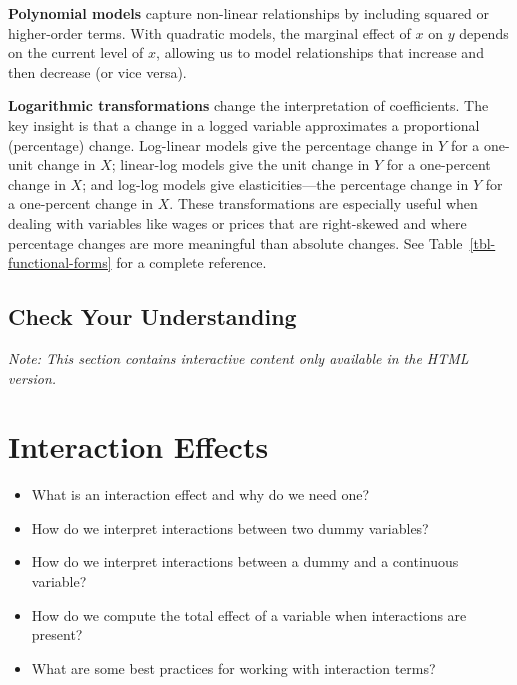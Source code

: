 \documentclass[
  letterpaper,
  DIV=11,
  numbers=noendperiod]{scrreprt}
\providecommand{\tightlist}{%
  \setlength{\itemsep}{0pt}\setlength{\parskip}{0pt}}
\begin{document}
\textbf{Polynomial models} capture non-linear relationships by including
squared or higher-order terms. With quadratic models, the marginal
effect of \(x\) on \(y\) depends on the current level of \(x\), allowing
us to model relationships that increase and then decrease (or vice
versa).

\textbf{Logarithmic transformations} change the interpretation of
coefficients. The key insight is that a change in a logged variable
approximates a proportional (percentage) change. Log-linear models give
the percentage change in \(Y\) for a one-unit change in \(X\);
linear-log models give the unit change in \(Y\) for a one-percent change
in \(X\); and log-log models give elasticities---the percentage change
in \(Y\) for a one-percent change in \(X\). These transformations are
especially useful when dealing with variables like wages or prices that
are right-skewed and where percentage changes are more meaningful than
absolute changes. See Table~\ref{tbl-functional-forms} for a complete
reference.

\section{Check Your Understanding}\label{check-your-understanding-5}

\emph{Note: This section contains interactive content only available in
the HTML version.}


\chapter{Interaction Effects}\label{sec-interaction-effects}

\begin{tcolorbox}[enhanced jigsaw, arc=.35mm, bottomrule=.15mm, bottomtitle=1mm, breakable, colback=white, colbacktitle=quarto-callout-tip-color!10!white, colframe=quarto-callout-tip-color-frame, coltitle=black, left=2mm, leftrule=.75mm, opacityback=0, opacitybacktitle=0.6, rightrule=.15mm, title=\textcolor{quarto-callout-tip-color}{\faLightbulb}\hspace{0.5em}{\textbf{Key Questions}}, titlerule=0mm, toprule=.15mm, toptitle=1mm]

\begin{itemize}
\tightlist
\item
  What is an interaction effect and why do we need one?
\item
  How do we interpret interactions between two dummy variables?
\item
  How do we interpret interactions between a dummy and a continuous
  variable?
\item
  How do we compute the total effect of a variable when interactions are
  present?
\item
  What are some best practices for working with interaction terms?
\end{itemize}

\end{tcolorbox}
\end{document}
